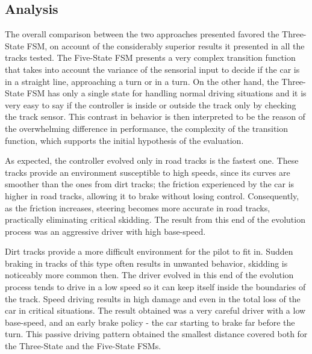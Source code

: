 	
	
\subsection{Analysis} \label{subsec:Analysis}
	
	The overall comparison between the two approaches presented favored the Three-State FSM, on account of the considerably superior results it presented in all the tracks tested. The Five-State FSM presents a very complex transition function that takes into account the variance of the sensorial input to decide if the car is in a straight line, approaching a turn or in a turn. On the other hand, the Three-State FSM has only a single state for handling normal driving situations and it is very easy to say if the controller is inside or outside the track only by checking the track sensor. This contrast in behavior is then interpreted to be the reason of the overwhelming difference in performance, the complexity of the transition function, which supports the initial hypothesis of the evaluation.
	
	As expected, the controller evolved only in road tracks is the fastest one. These tracks provide an environment susceptible to high speeds, since its curves are smoother than the ones from dirt tracks; the friction experienced by the car is higher in road tracks, allowing it to brake without losing control. Consequently, as the friction increases, steering becomes more accurate in road tracks, practically eliminating critical skidding. The result from this end of the evolution process was an aggressive driver with high base-speed.
	
	Dirt tracks provide a more difficult environment for the pilot to fit in. Sudden braking in tracks of this type often results in unwanted behavior, skidding is noticeably more common then. The driver evolved in this end of the evolution process tends to drive in a low speed so it can keep itself inside the boundaries of the track. Speed driving results in high damage and even in the total loss of the car in critical situations. The result obtained was a very careful driver with a low base-speed, and an early brake policy - the car starting to brake far before the turn. This passive driving pattern obtained the smallest distance covered both for the Three-State and the Five-State FSMs.
	
